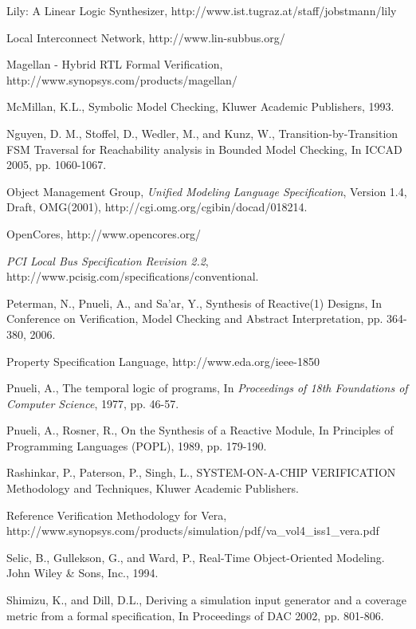 \documentclass[a4paper, 11pt]{article}
\begin{document}
{\begin{thebibliography}{99}
 Lily: A Linear Logic Synthesizer, 
	http://www.ist.tugraz.at/staff/jobstmann/lily

 Local Interconnect Network, http://www.lin-subbus.org/

 Magellan - Hybrid RTL Formal Verification, 
        http://www.synopsys.com/products/magellan/

 McMillan, K.L., Symbolic Model Checking, Kluwer Academic 
	Publishers, 1993.

 Nguyen, D. M., Stoffel, D., Wedler, M., and
        Kunz, W., Transition-by-Transition FSM Traversal
        for Reachability analysis in Bounded Model Checking,
        In ICCAD 2005, pp. 1060-1067. 

 Object Management Group, {\em Unified Modeling
    Language Specification}, Version 1.4, Draft, OMG(2001),
    http://cgi.omg.org/cgibin/docad/018214.

 OpenCores, http://www.opencores.org/

 {\em PCI Local Bus Specification Revision 2.2},
        http://www.pcisig.com/specifications/conventional.

 Peterman, N., Pnueli, A., and Sa'ar, Y.,
    Synthesis of Reactive(1) Designs, In Conference on
    Verification, Model Checking and Abstract Interpretation,
    pp. 364-380, 2006.

 Property Specification Language, http://www.eda.org/ieee-1850 

 Pnueli, A., The temporal logic of programs,
        In {\em Proceedings of 18th Foundations of Computer Science},
        1977, pp. 46-57.

 Pnueli, A., Rosner, R., On the Synthesis of a Reactive Module,
        In Principles of Programming Languages (POPL), 1989, pp. 179-190.

 Rashinkar, P., Paterson, P., Singh, L.,
    SYSTEM-ON-A-CHIP VERIFICATION Methodology and Techniques,
    Kluwer Academic Publishers.

 Reference Verification Methodology for Vera, \\
    http://www.synopsys.com/products/simulation/pdf/va\_vol4\_iss1\_vera.pdf

 Selic, B., Gullekson, G., and Ward, P., Real-Time
    Object-Oriented Modeling. John Wiley \& Sons, Inc., 1994.

 Shimizu, K., and Dill, D.L., Deriving a simulation input
        generator and a coverage metric from a formal specification, In
        Proceedings of DAC 2002, pp. 801-806.


\end{thebibliography}}
\end{document}
